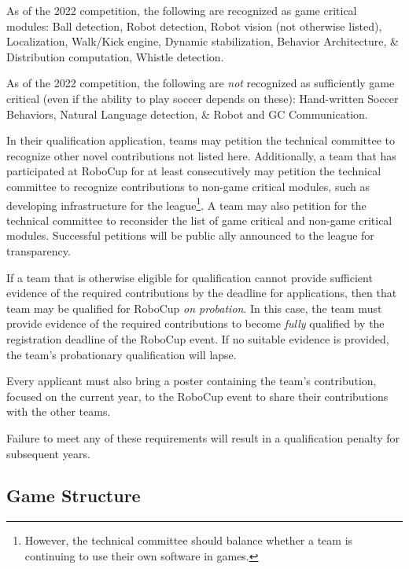 As of the 2022 competition, the following are recognized as game critical modules:
Ball detection, Robot detection, Robot vision (not otherwise listed), Localization, Walk/Kick engine, Dynamic stabilization, Behavior Architecture, \& Distribution computation, Whistle detection.

As of the 2022 competition, the following are \textit{not} recognized as sufficiently game critical (even if the ability to play soccer depends on these):
Hand-written Soccer Behaviors, Natural Language detection, \& Robot and GC Communication.

In their qualification application, teams may petition the technical committee to recognize other novel contributions not listed here.
Additionally, a team that has participated at RoboCup for at least \NovelContributionTime consecutively may petition the technical committee to recognize contributions to non-game critical modules, such as developing infrastructure for the league\footnote{However, the technical committee should balance whether a team is continuing to use their own software in games.}.
A team may also petition for the technical committee to reconsider the list of game critical and non-game critical modules.
Successful petitions will be public ally announced to the league for transparency.

If a team that is otherwise eligible for qualification cannot provide sufficient evidence of the required contributions by the deadline for applications, then that team may be qualified for RoboCup \textit{on probation}.
In this case, the team must provide evidence of the required contributions to become \textit{fully} qualified by the registration deadline of the RoboCup event.
If no suitable evidence is provided, the team's probationary qualification will lapse.

Every applicant must also bring a poster containing the team's contribution, focused on the current year, to the RoboCup event to share their contributions with the other teams.

Failure to meet any of these requirements will result in a qualification penalty for subsequent years.

\subsection{Game Structure}

